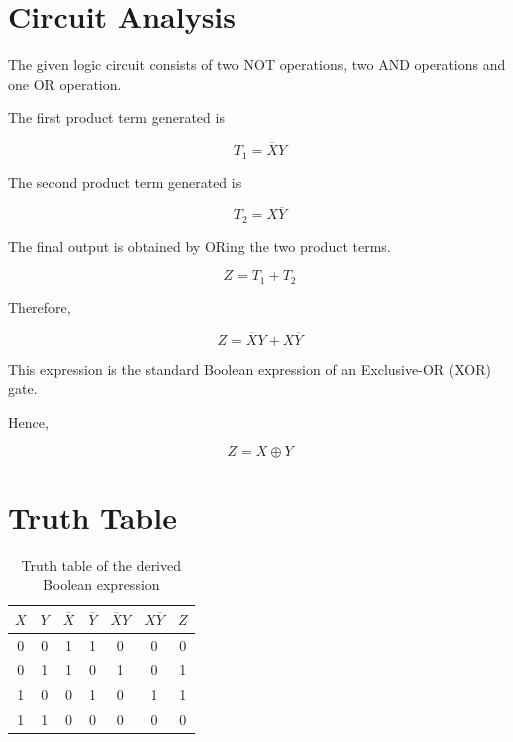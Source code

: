 \documentclass[12pt,a4paper]{article}
\begin{document}
\section{Circuit Analysis}

The given logic circuit consists of two NOT operations, two AND operations and one OR operation.

The first product term generated is

\[
T_1=\overline{X}Y
\]

The second product term generated is

\[
T_2=X\overline{Y}
\]

The final output is obtained by ORing the two product terms.

\[
Z=T_1+T_2
\]

Therefore,

\[
Z=\overline{X}Y+X\overline{Y}
\]

This expression is the standard Boolean expression of an Exclusive-OR (XOR) gate.

Hence,

\[
\boxed{Z=X\oplus Y}
\]


\section{Truth Table}

\begin{table}[H]
\centering

\renewcommand{\arraystretch}{1.4}

\begin{tabular}{|c|c|c|c|c|c|c|}
\hline

$X$ &
$Y$ &
$\overline X$ &
$\overline Y$ &
$\overline XY$ &
$X\overline Y$ &
$Z$

\\
\hline

0&0&1&1&0&0&0\\
\hline

0&1&1&0&1&0&1\\
\hline

1&0&0&1&0&1&1\\
\hline

1&1&0&0&0&0&0\\
\hline

\end{tabular}

\caption{Truth table of the derived Boolean expression}

\end{table}
\end{document}

